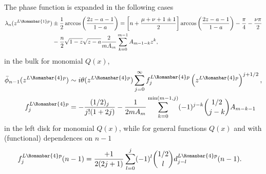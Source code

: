\documentclass[11pt]{article}
\newcommand{\ql}{L}
\newcommand{\rb}{{\scriptsize \Romanbar{1}} }
\newcommand{\rl}{{\scriptsize \Romanbar{4}} }
\newcommand{\pg}{p}
\numberwithin{equation}{section}
\begin{document}
The phase function is expanded in the following cases
\begin{align}
	\lambda_n(z^{\ql\rb\pg}) & \pm  \frac{1}{2} \arccos\left(\frac{2z -a-1}{1-a}\right)  =  \left[n + \frac{\mu + \nu +1 \pm 1}{2}\right]\arccos\left(\frac{2z -a-1}{1-a}\right)   -\frac{\pi}{4} -\frac{\nu\pi}{2} \\ %
	&  -\frac{n}{2} \sqrt{1-z}\sqrt{z-a} \frac{2}{mA_m}\sum_{k=0}^{m-1} A_{m-1-k}z^k,
\end{align}
in the bulk for monomial $Q(x)$, 
\begin{align}
	\bar{\phi}_{n-1}(z^{\ql\rl\pg}) & \sim  i \theta(z^{\ql\rl\pg}) \sum_{j=0}^\infty f_j^{\ql\rl\pg} \left(z^{\ql\rl\pg}\right)^{j+1/2}, \\
	f_j^{\ql\rl\pg} & = -\frac{(1/2)_j }{j!(1+2j)} - \frac{1}{2 m A_m}\sum_{k=0}^{\min(m-1,j)} (-1)^{j-k} {1/2 \choose j-k} A_{m-k-1} 
\end{align}
in the left disk for monomial $Q(x)$, while for general functions $Q(x)$ and with (functional) dependences on $n-1$%
\begin{align}
	f_j^{\ql\rl\pg}(n-1) & = \frac{+1}{2(2j+1)} \sum_{l=0}^j (-1)^l { 1/2 \choose l } d_{j-l}^{\ql\rl\pg}(n-1).
\end{align}


\end{document}
